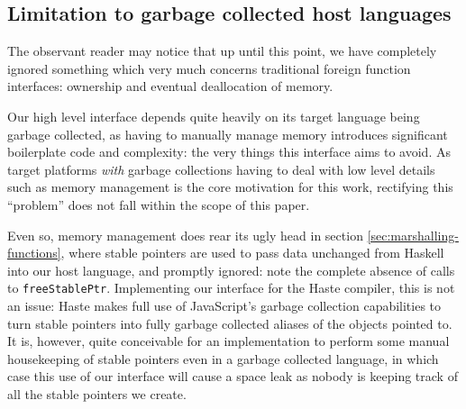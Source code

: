 \documentclass[preprint]{sigplanconf}
\begin{document}
\subsection{Limitation to garbage collected host languages}
\label{sec:host-gc}
The observant reader may notice that up until this point, we have completely
ignored something which very much concerns traditional foreign function
interfaces: ownership and eventual deallocation of memory.

Our high level interface depends quite heavily on its target language being
garbage collected, as having to manually manage memory introduces significant
boilerplate code and complexity: the very things this interface aims to avoid.
As target platforms \emph{with} garbage collections having to deal with low
level details such as memory management is the core motivation for this work,
rectifying this ``problem'' does not fall within the scope of this paper.

Even so, memory management does rear its ugly head in section
\ref{sec:marshalling-functions}, where stable pointers are used to pass data
unchanged from Haskell into our host language, and promptly ignored: note
the complete absence of calls to \lstinline!freeStablePtr!. Implementing our
interface for the Haste compiler, this is not an issue: Haste makes full use
of JavaScript's garbage collection capabilities to turn stable pointers into
fully garbage collected aliases of the objects pointed to.
It is, however, quite conceivable for an implementation to perform some manual
housekeeping of stable pointers even in a garbage collected language, in which
case this use of our interface will cause a space leak as nobody is keeping
track of all the stable pointers we create.
\end{document}
